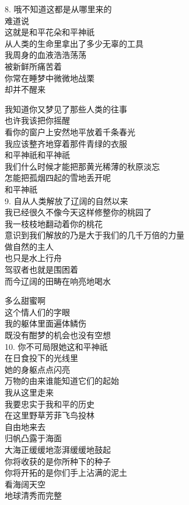 \documentclass{article}
\begin{document}
8. 哦不知道这都是从哪里来的\\
难道说\\
这就是和平花朵和平神祇
\\
从人类的生命里拿出了多少无辜的工具 \\ 


我周身的血液浩浩荡荡\\
被新鲜所痛苦着\\
你常在睡梦中微微地战栗\\
却并不醒来\\
\newpage

我知道你又梦见了那些人类的往事
\\
也许我该把你摇醒 \\ 


看你的窗户上安然地平放着千条春光\\
我应该整齐地穿着那件青绿的衣服\\
和平神祇和平神祇\\
我们什么时候才能把那黄光稀薄的秋原淡忘\\
怎能把孤烟四起的雪地丢开呢
\\
和平神祇 \\ 


9. 自从人类解放了辽阔的自然以来\\
我已经很久不像今天这样修整你的桃园了\\
我一枝枝地翻动着你的桃花\\
意识到我们解放的乃是大于我们的几千万倍的力量
 \\ 


做自然的主人\\
也只是水上行舟
\\
驾驭者也就是围困着 \\ 


而今辽阔的田畴在响亮地喝水\\
\newpage

多么甜蜜啊\\
这个情人们的字眼\\
我的躯体里面遍体鳞伤
\\
既没有酣梦的机会也没有空想 \\ 


10. 你不可局限她这和平神祇\\
在日食投下的光线里
\\
她的身躯点点闪亮 \\ 


万物的由来谁能知道它们的起始\\
我从这里走来\\
我要忠实于我和平的历史\\
在这里野草芳菲飞鸟投林\\
自由地来去\\
归帆凸露于海面\\
大海正缓缓地澎湃缓缓地鼓起\\
你将收获的是你所种下的种子\\
你将开拓的是你们手上沾满的泥土\\
看海阔天空
\\
地球清秀而完整 \par \\
\newpage
\end{document}
